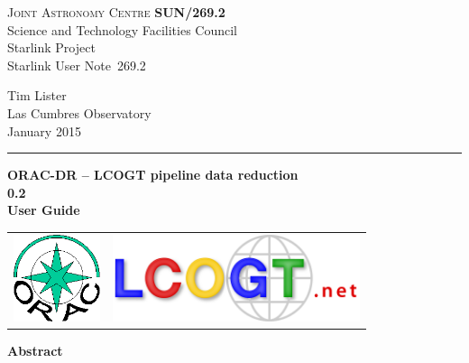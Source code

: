 \documentclass[twoside,11pt]{article}
\newcommand{\stardoccategory}  {Starlink User Note}
\newcommand{\stardocinitials}  {SUN}
\newcommand{\stardocnumber}    {269.2}
\newcommand{\stardocauthors}   {Tim Lister \\
                                Las Cumbres Observatory}
\newcommand{\stardocdate}      {January 2015}
\newcommand{\stardoctitle}     {ORAC-DR -- LCOGT pipeline data reduction}
\newcommand{\stardocversion}   {0.2}
\newcommand{\stardocmanual}    {User Guide}
\newcommand{\stardocname}{\stardocinitials /\stardocnumber}
\newenvironment{latexonly}{}{}
\renewcommand{\_}{\texttt{\symbol{95}}}
\begin{document}
\setcounter{secnumdepth}{5}
\thispagestyle{empty}

\begin{latexonly}
   \textsc{Joint Astronomy Centre} \hfill \textbf{\stardocname}\\
   {\large Science and Technology Facilities Council}\\
   {\large Starlink Project\\ }
   {\large \stardoccategory\ \stardocnumber}
   \begin{flushright}
   \stardocauthors\\
   \stardocdate
   \end{flushright}
   \vspace{-4mm}
   \rule{\textwidth}{0.5mm}
   \vspace{5mm}
   \begin{center}
   {\Huge\textbf{\stardoctitle \\ [2.5ex]}}
   {\LARGE\textbf{\stardocversion \\ [4ex]}}
   {\Huge\textbf{\stardocmanual}}
   \end{center}
   \vspace{5mm}

\begin{center}
\begin{tabular}{cc}
\includegraphics[width=1.0in]{sun260_logo} & 
\includegraphics[height=1.0in]{sun269_logo} \\
\end{tabular}
\end{center}

   \vspace{10mm}
   \begin{center}
      {\Large\textbf{Abstract}}
   \end{center}
\end{latexonly}
\end{document}
